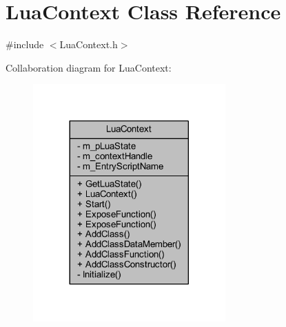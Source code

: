 \hypertarget{class_lua_context}{}\section{Lua\+Context Class Reference}
\label{class_lua_context}


{\ttfamily \#include $<$Lua\+Context.\+h$>$}



Collaboration diagram for Lua\+Context\+:\nopagebreak
\begin{figure}[H]
\begin{center}
\leavevmode
\includegraphics[width=209pt]{class_lua_context__coll__graph}
\end{center}
\end{figure}
